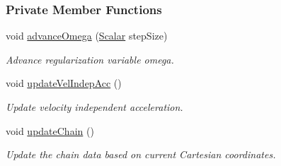 \subsubsection*{Private Member Functions}
\begin{DoxyCompactItemize}
\item 
void \mbox{\hyperlink{class_a_rchain_3_01_newtonian_3_01typename_01_evolved_data_1_1_scalar_01_4_00_01_evolved_data_00_01_regularitor_01_4_a8427d55e9b05fca4a1db2b9024940e06}{advance\+Omega}} (\mbox{\hyperlink{class_a_rchain_3_01_newtonian_3_01typename_01_evolved_data_1_1_scalar_01_4_00_01_evolved_data_00_01_regularitor_01_4_a2c77dc1b58a25ac5c6ee95dd7809f693}{Scalar}} step\+Size)
\begin{DoxyCompactList}\small\item\em Advance regularization variable omega. \end{DoxyCompactList}\item 
void \mbox{\hyperlink{class_a_rchain_3_01_newtonian_3_01typename_01_evolved_data_1_1_scalar_01_4_00_01_evolved_data_00_01_regularitor_01_4_a2b11ca856564416ed6727c716ed284a8}{update\+Vel\+Indep\+Acc}} ()
\begin{DoxyCompactList}\small\item\em Update velocity independent acceleration. \end{DoxyCompactList}\item 
void \mbox{\hyperlink{class_a_rchain_3_01_newtonian_3_01typename_01_evolved_data_1_1_scalar_01_4_00_01_evolved_data_00_01_regularitor_01_4_acbe31e9aa918e4f80a2763e16f0bb7bc}{update\+Chain}} ()
\begin{DoxyCompactList}\small\item\em Update the chain data based on current Cartesian coordinates. \end{DoxyCompactList}\end{DoxyCompactItemize}
